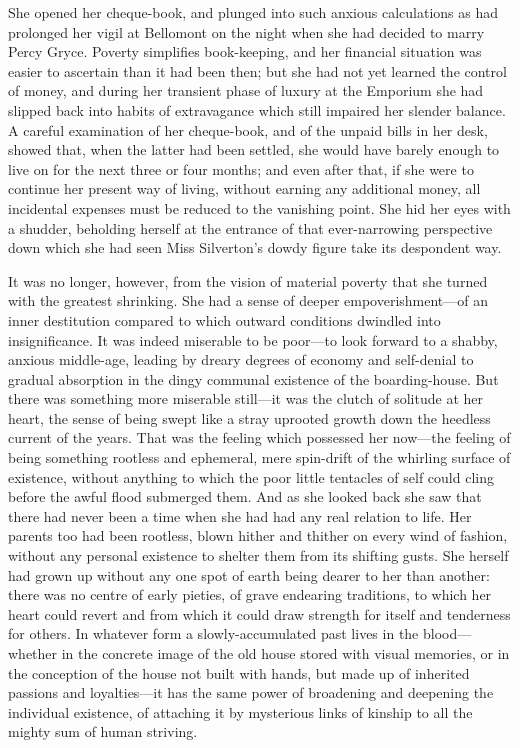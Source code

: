 \documentclass[12pt,a4paper]{book}
\begin{document}
She opened her cheque-book, and plunged into such anxious
calculations as had prolonged her vigil at Bellomont on the night
when she had decided to marry Percy Gryce. Poverty simplifies
book-keeping, and her financial situation was easier to ascertain
than it had been then; but she had not yet learned the
control of money, and during her transient phase of luxury at the
Emporium she had slipped back into habits of extravagance which
still impaired her slender balance. A careful examination of her
cheque-book, and of the unpaid bills in her desk, showed that,
when the latter had been settled, she would have barely enough to
live on for the next three or four months; and even after that,
if she were to continue her present way of living, without
earning any additional money, all incidental expenses must be
reduced to the vanishing point. She hid her eyes with a shudder,
beholding herself at the entrance of that ever-narrowing
perspective down which she had seen Miss Silverton's dowdy figure
take its despondent way.





It was no longer, however, from the vision of material poverty
that she turned with the greatest shrinking. She had a sense of
deeper empoverishment---of an inner destitution compared to which
outward conditions dwindled into insignificance. It was indeed
miserable to be poor---to look forward to a shabby, anxious
middle-age, leading by dreary degrees of economy and self-denial
to gradual absorption in the dingy communal existence of the
boarding-house. But there was something more miserable still---it
was the clutch of solitude at her heart, the sense of being swept
like a stray uprooted growth down the heedless current of the
years. That was the feeling which possessed her now---the feeling
of being something rootless and ephemeral, mere spin-drift of the
whirling surface of existence, without anything to which the poor
little tentacles of self could cling before the awful flood
submerged them. And as she looked back she saw that there had
never been a time when she had had any real relation to life. Her
parents too had been rootless, blown hither and thither on every
wind of fashion, without any personal existence to shelter them
from its shifting gusts. She herself had grown up without any one
spot of earth being dearer to her than another: there was no
centre of early pieties, of grave endearing traditions, to which
her heart could revert and from which it could draw strength for
itself and tenderness for others. In whatever form a
slowly-accumulated past lives in the blood---whether in the
concrete image of the old house stored with visual memories, or
in the conception of the house not built with hands, but
made up of inherited passions and loyalties---it has the same
power of broadening and deepening the individual existence, of
attaching it by mysterious links of kinship to all the mighty sum
of human striving.
\end{document}
